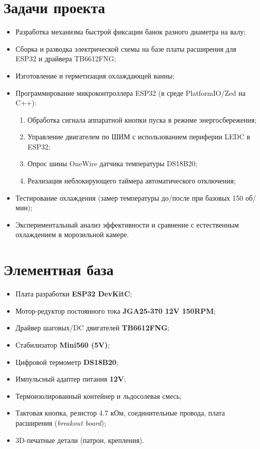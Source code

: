 \documentclass[a4paper,12pt]{article}
\begin{document}
\section{Задачи проекта}
\begin{itemize}
    \item Разработка механизма быстрой фиксации банок разного диаметра на валу;
    \item Сборка и разводка электрической схемы на базе платы расширения для ESP32 и драйвера TB6612FNG;
    \item Изготовление и герметизация охлаждающей ванны;
    \item Программирование микроконтроллера ESP32 (в среде PlatformIO/Zed на C++):
    \begin{enumerate}
        \item Обработка сигнала аппаратной кнопки пуска в режиме энергосбережения;
        \item Управление двигателем по ШИМ с использованием периферии LEDC в ESP32;
        \item Опрос шины OneWire датчика температуры DS18B20;
        \item Реализация неблокирующего таймера автоматического отключения;
    \end{enumerate}
    \item Тестирование охлаждения (замер температуры до/после при базовых 150 об/мин);
    \item Экспериментальный анализ эффективности и сравнение с естественным охлаждением в морозильной камере.
\end{itemize}

\section{Элементная база}
\begin{itemize}
    \item Плата разработки \textbf{ESP32 DevKitC};
    \item Мотор-редуктор постоянного тока \textbf{JGA25-370 12V 150RPM};
    \item Драйвер шаговых/DC двигателей \textbf{TB6612FNG};
    \item Стабилизатор \textbf{Mini560 (5V)};
    \item Цифровой термометр \textbf{DS18B20};
    \item Импульсный адаптер питания \textbf{12V};
    \item Термоизолированный контейнер и льдосолевая смесь;
    \item Тактовая кнопка, резистор 4.7 кОм, соединительные провода, плата расширения (\textit{breakout board});
    \item 3D-печатные детали (патрон, крепления).
\end{itemize}
\end{document}
